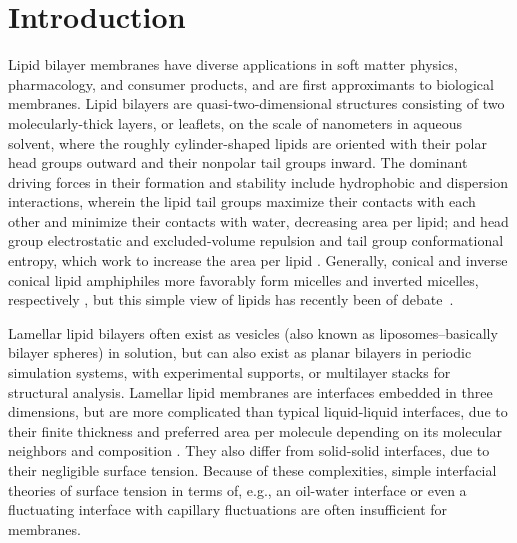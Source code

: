 \documentclass[9pt,bestpractices]{livecoms}
\begin{document}
\section{Introduction}
\label{sec:intro}
Lipid bilayer membranes have diverse applications in soft matter physics, pharmacology, and consumer products, and are first approximants to biological membranes.
Lipid bilayers are quasi-two-dimensional structures consisting of two molecularly-thick layers, or leaflets, on the scale of nanometers in aqueous solvent, where the roughly cylinder-shaped lipids are oriented with their polar head groups outward and their nonpolar tail groups inward.
The dominant driving forces in their formation and stability include hydrophobic and dispersion interactions, wherein the lipid tail groups maximize their contacts with each other and minimize their contacts with water, decreasing area per lipid; and head group electrostatic and excluded-volume repulsion and tail group conformational entropy, which work to increase the area per lipid \cite{Ben-Shaul1995}.
Generally, conical and inverse conical lipid amphiphiles more favorably form micelles and inverted micelles, respectively \cite{Israelachvili2011}, but this simple view of lipids has recently been of debate~\cite{Sodt2014,Sodt2016}.

Lamellar lipid bilayers often exist as vesicles (also known as liposomes--basically bilayer spheres) in solution, but can also exist as planar bilayers in periodic simulation systems, with experimental supports, or multilayer stacks for structural analysis.
Lamellar lipid membranes are interfaces embedded in three dimensions, but are more complicated than typical liquid-liquid interfaces, due to their finite thickness and preferred area per molecule depending on its molecular neighbors and composition \cite{Diamant2011,Safran1994}.
They also differ from solid-solid interfaces, due to their negligible surface tension.
Because of these complexities, simple interfacial theories of surface tension in terms of, e.g., an oil-water interface or even a fluctuating interface with capillary fluctuations are often insufficient for membranes.
\end{document}
